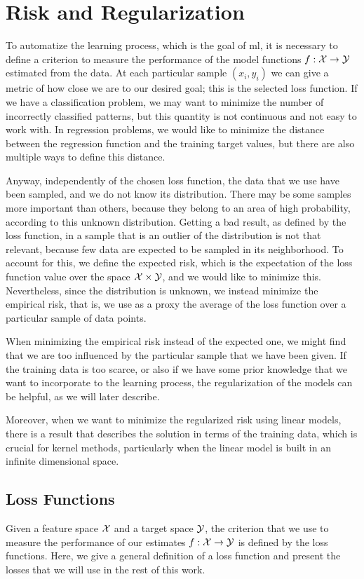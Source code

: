 \section{Risk and Regularization}\label{sec:risk_reg}
To automatize the learning process, which is the goal of \acrshort{ml}, it is necessary to define a criterion to measure the performance of the model functions $f: \mathcal{X} \to \mathcal{Y}$ estimated from the data.
At each particular sample $(x_i, y_i)$ we can give a metric of how close we are to our desired goal; this is the selected loss function. If we have a classification problem, we may want to minimize the number of incorrectly classified patterns, but this quantity is not continuous and not easy to work with. In regression problems, we would like to minimize the distance between the regression function and the training target values, but there are also multiple ways to define this distance. 
%

Anyway, independently of the chosen loss function, the data that we use have been sampled, and we do not know its distribution. There may be some samples more important than others, because they belong to an area of high probability, according to this unknown distribution. Getting a bad result, as defined by the loss function, in a sample that is an outlier of the distribution is not that relevant, because few data are expected to be sampled in its neighborhood. 
To account for this, we define the expected risk, which is the expectation of the loss function value over the space $\mathcal{X} \times \mathcal{Y}$, and we would like to minimize this. Nevertheless, since the distribution is unknown, we instead minimize the empirical risk, that is, we use as a proxy the average of the loss function over a particular sample of data points.

%
When minimizing the empirical risk instead of the expected one, we might find that we are too influenced by the particular sample that we have been given.  If the training data is too scarce, or also if we have some prior knowledge that we want to incorporate to the learning process, the regularization of the models can be helpful, as we will later describe.
%

Moreover, when we want to minimize the regularized risk using linear models, there is a result that describes the solution in terms of the training data, which is crucial for kernel methods, particularly when the linear model is built in an infinite dimensional space.

\subsection{Loss Functions}
Given a feature space $\mathcal{X}$ and a target space $\mathcal{Y}$, the criterion that we use to measure the performance of our estimates $f: \mathcal{X} \to \mathcal{Y}$ is defined by the loss functions.
Here, we give a general definition of a loss function and present the losses that we will use in the rest of this work.

